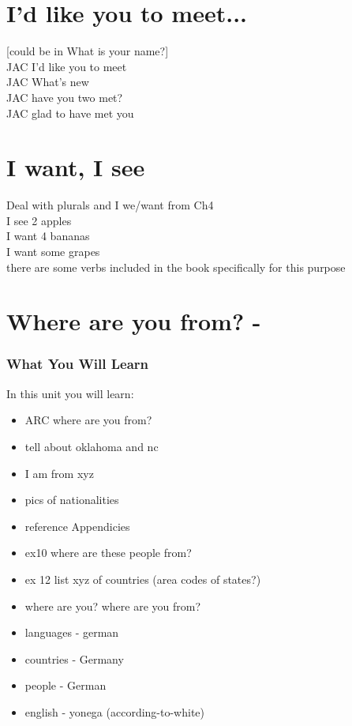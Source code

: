 \begin{multicols}
\chapter{I'd like you to meet...}
[could be in What is your name?]\\
JAC I'd like you to meet\\
JAC What's new\\
JAC have you two met?\\
JAC glad to have met you\\
\chapter{I want, I see}
Deal with plurals and I we/want from Ch4\\
I see 2 apples\\
I want 4 bananas\\
I want some grapes\\
there are some verbs included in the book specifically for this purpose\\
\index{}
\chapter{Where are you from? - }
\subsection{What You Will Learn}
In this unit you will learn:
\begin{itemize}
\item ARC where are you from?
\item tell about oklahoma and nc
\item I am from xyz
\item pics of nationalities
\item reference Appendicies
\item ex10 where are these people from?
\item ex 12 list xyz of countries (area codes of states?)
\item where are you?  where are you from?
\item languages - german
\item countries - Germany
\item people - German
\item english - yonega (according-to-white)
\end{itemize}\newpage


\end{multicols}
